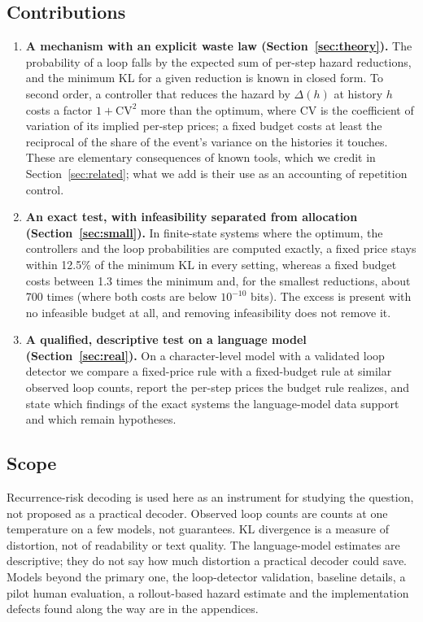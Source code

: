 \documentclass[make,article,submit,pdftex]{Definitions/mdpi}
\begin{document}
\subsection{Contributions}
\begin{enumerate}[leftmargin=*,itemsep=2pt]
\item \textbf{A mechanism with an explicit waste law (Section~\ref{sec:theory}).} The probability of a loop falls by the expected sum of per-step hazard reductions, and the minimum KL for a given reduction is known in closed form. To second order, a controller that reduces the hazard by $\Delta(h)$ at history $h$ costs a factor $1+\mathrm{CV}^2$ more than the optimum, where $\mathrm{CV}$ is the coefficient of variation of its implied per-step prices; a fixed budget costs at least the reciprocal of the share of the event's variance on the histories it touches. These are elementary consequences of known tools, which we credit in Section~\ref{sec:related}; what we add is their use as an accounting of repetition control.
\item \textbf{An exact test, with infeasibility separated from allocation (Section~\ref{sec:small}).} In finite-state systems where the optimum, the controllers and the loop probabilities are computed exactly, a fixed price stays within 12.5\% of the minimum KL in every setting, whereas a fixed budget costs between 1.3 times the minimum and, for the smallest reductions, about 700 times (where both costs are below $10^{-10}$ bits). The excess is present with no infeasible budget at all, and removing infeasibility does not remove it.
\item \textbf{A qualified, descriptive test on a language model (Section~\ref{sec:real}).} On a character-level model with a validated loop detector we compare a fixed-price rule with a fixed-budget rule at similar observed loop counts, report the per-step prices the budget rule realizes, and state which findings of the exact systems the language-model data support and which remain hypotheses.
\end{enumerate}

\subsection{Scope}
Recurrence-risk decoding is used here as an instrument for studying the question, not proposed as a practical decoder. Observed loop counts are counts at one temperature on a few models, not guarantees. KL divergence is a measure of distortion, not of readability or text quality. The language-model estimates are descriptive; they do not say how much distortion a practical decoder could save. Models beyond the primary one, the loop-detector validation, baseline details, a pilot human evaluation, a rollout-based hazard estimate and the implementation defects found along the way are in the appendices.
\end{document}
